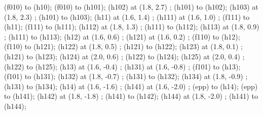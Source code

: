 {\begin{feynhand}
            \propag[plain] (f010) to (h10);
            \propag[plain] (f010) to (h101);
            \vertex [ringdot] (h102) at (1.8, 2.7) {};
            \propag[plain] (h101) to (h102);
            \vertex [ringdot] (h103) at (1.8, 2.3) {};
            \propag[plain] (h101) to (h103);
            \vertex [ringdot] (h11) at (1.6, 1.4) {};
            \vertex [ringdot] (h111) at (1.6, 1.0) {};	
            \propag[plain] (f111) to (h11);
            \propag[plain] (f111) to (h111);
            \vertex [ringdot] (h112) at (1.8, 1.3) {};
            \propag[plain] (h111) to (h112);
            \vertex [ringdot] (h113) at (1.8, 0.9) {};
            \propag[plain] (h111) to (h113);
            \vertex [ringdot] (h12) at (1.6, 0.6) {};
            \vertex [ringdot] (h121) at (1.6, 0.2) {};
            \propag[plain] (f110) to (h12);
            \propag[plain] (f110) to (h121);
            \vertex [ringdot] (h122) at (1.8, 0.5) {};
            \propag[plain] (h121) to (h122);
            \vertex [ringdot] (h123) at (1.8, 0.1) {};
            \propag[plain] (h121) to (h123);
            \vertex [ringdot] (h124) at (2.0, 0.6) {};
            \propag[plain] (h122) to (h124);
            \vertex [ringdot] (h125) at (2.0, 0.4) {};
            \propag[plain] (h122) to (h125);
            \vertex [ringdot] (h13) at (1.6, -0.4) {};
            \vertex [ringdot] (h131) at (1.6, -0.8) {};
            \propag[plain] (f101) to (h13);
            \propag[plain] (f101) to (h131);
            \vertex [ringdot] (h132) at (1.8, -0.7) {};
            \propag[plain] (h131) to (h132);
            \vertex [ringdot] (h134) at (1.8, -0.9) {};
            \propag[plain] (h131) to (h134);
            \vertex [ringdot] (h14) at (1.6, -1.6) {};
            \vertex [ringdot] (h141) at (1.6, -2.0) {};
            \propag[plain] (epp) to (h14);
            \propag[plain] (epp) to (h141);
            \vertex [ringdot] (h142) at (1.8, -1.8) {};
            \propag[plain] (h141) to (h142);
            \vertex [ringdot] (h144) at (1.8, -2.0) {};
            \propag[plain] (h141) to (h144);
        \end{feynhand}
                
}

